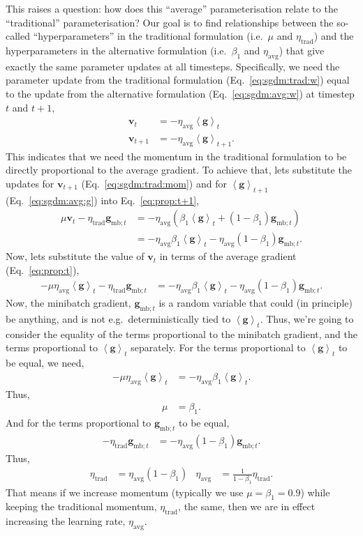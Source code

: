 \documentclass{article}
\newcommand{\bracket}[3]{\left#1 #3 \right#2}
\newcommand{\ab}{\bracket{\langle}{\rangle}}
\renewcommand{\b}{\bracket{(}{)}}
\newcommand{\0}{\mathbf{0}}
\newcommand{\g}{\mathbf{g}}
\newcommand{\mom}{\mathbf{v}}
\newcommand{\gmbt}{\g_{\text{mb}; t}}
\newcommand{\gb}{\mathbf{\ab{g}}}
\newcommand{\lrtrad}{\eta_\text{trad}}
\newcommand{\lravg}{\eta_\text{avg}}
\begin{document}
This raises a question: how does this ``average'' parameterisation relate to the ``traditional'' parameterisation?
Our goal is to find relationships between the so-called ``hyperparameters'' in the traditional formulation (i.e.\ $\mu$ and $\lrtrad$) and the hyperparameters in the alternative formulation (i.e.\ $\beta_1$ and $\lravg$) that give exactly the same parameter updates at all timesteps.
Specifically, we need the parameter update from the traditional formulation (Eq.~\ref{eq:sgdm:trad:w}) equal to the update from the alternative formulation (Eq.~\ref{eq:sgdm:avg:w}) at timestep $t$ and $t+1$,
\begin{align}
  \label{eq:prop:t}
  \mom_{t} &= - \lravg \gb_{t} \\
  \label{eq:prop:t+1}
  \mom_{t+1} &= - \lravg \gb_{t+1}.
\end{align}
This indicates that we need the momentum in the traditional formulation to be directly proportional to the average gradient.
To achieve that, lets substitute the updates for $\mom_{t+1}$ (Eq.~\ref{eq:sgdm:trad:mom}) and for $\gb_{t+1}$ (Eq.~\ref{eq:sgdm:avg:g}) into Eq.~\eqref{eq:prop:t+1},
\begin{align}
  \nonumber
  \mu \mom_t - \lrtrad \gmbt &= - \lravg \b{\beta_1 \gb_t + (1-\beta_1) \gmbt} \\
  &= - \lravg \beta_1 \gb_t - \lravg (1-\beta_1) \gmbt.
\end{align}
Now, lets substitute the value of $\mom_t$ in terms of the average gradient (Eq.~\ref{eq:prop:t}),
\begin{align}
  - \mu \lravg \gb_{t} - \lrtrad \gmbt &= - \lravg \beta_1 \gb_t - \lravg (1-\beta_1) \gmbt.
\end{align}
Now, the minibatch gradient, $\gmbt$ is a random variable that could (in principle) be anything, and is not e.g.\ deterministically tied to $\gb_t$.
Thus, we're going to consider the equality of the terms proportional to the minibatch gradient, and the terms proportional to $\gb_t$ separately.
For the terms proportional to $\gb_t$ to be equal, we need,
\begin{align}
  - \mu \lravg \gb_{t} &= - \lravg \beta_1 \gb_t.
\end{align}
Thus,
\begin{align}
  \mu &= \beta_1.
\end{align}
And for the terms proportional to $\gmbt$ to be equal,
\begin{align}
  - \lrtrad \gmbt &= - \lravg (1-\beta_1) \gmbt.
\end{align}
Thus,
\begin{align}
  \lrtrad &= \lravg (1-\beta_1) & 
  \lravg &= \tfrac{1}{1 -\beta_1} \lrtrad.
\end{align}
That means if we increase momentum (typically we use $\mu=\beta_1=0.9$) while keeping the traditional momentum, $\lrtrad$, the same, then we are in effect increasing the learning rate, $\lravg$.
\end{document}
